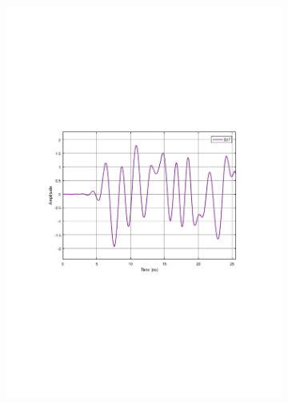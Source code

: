 \begin{refsection}
\begin{figure}[h!]
\centering
\begin{subfigure}{.5\textwidth}
  \centering
  \includegraphics[width=\linewidth]{./sdf/dsp_laser_phase_compensation/figures/S17_td.pdf}
  \caption{}
  \label{fig:sub1}
\end{subfigure}%
\begin{subfigure}{.5\textwidth}
  \centering

\end{subfigure}
\end{figure}
\end{refsection}
